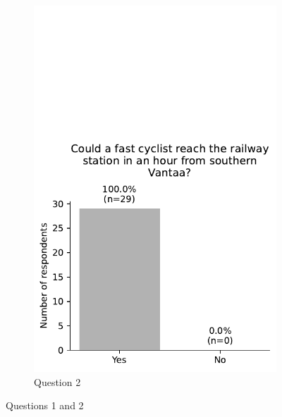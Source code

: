 \begin{figure}[H]
\begin{subfigure}[b]{0.5\textwidth}
		\includegraphics[width=\textwidth]{images/questionnaire/1.pdf}
		\caption{Question 2}
		\label{fig:Question 2}
	\end{subfigure}%
	\caption{Questions 1 and 2}
	\label{fig:Questions 1 and 2}
\end{figure}

